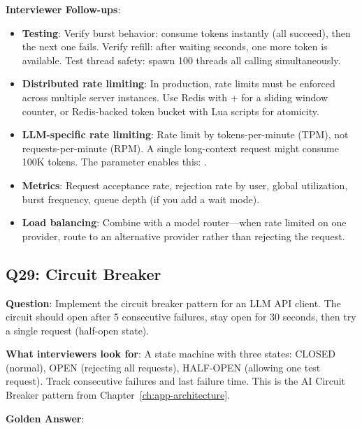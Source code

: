 \textbf{Interviewer Follow-ups}:
\begin{itemize}[leftmargin=*]
    \item \textbf{Testing}: Verify burst behavior: consume  tokens instantly (all succeed), then the next one fails. Verify refill: after waiting  seconds, one more token is available. Test thread safety: spawn 100 threads all calling  simultaneously.
    \item \textbf{Distributed rate limiting}: In production, rate limits must be enforced across multiple server instances. Use Redis with  +  for a sliding window counter, or Redis-backed token bucket with Lua scripts for atomicity.
    \item \textbf{LLM-specific rate limiting}: Rate limit by tokens-per-minute (TPM), not requests-per-minute (RPM). A single long-context request might consume 100K tokens. The  parameter enables this: .
    \item \textbf{Metrics}: Request acceptance rate, rejection rate by user, global utilization, burst frequency, queue depth (if you add a wait mode).
    \item \textbf{Load balancing}: Combine with a model router---when rate limited on one provider, route to an alternative provider rather than rejecting the request.
\end{itemize}

\subsection{Q29: Circuit Breaker}

\textbf{Question}: Implement the circuit breaker pattern for an LLM API client. The circuit should open after 5 consecutive failures, stay open for 30 seconds, then try a single request (half-open state).

\textbf{What interviewers look for}: A state machine with three states: CLOSED (normal), OPEN (rejecting all requests), HALF-OPEN (allowing one test request). Track consecutive failures and last failure time. This is the AI Circuit Breaker pattern from Chapter~\ref{ch:app-architecture}.

\textbf{Golden Answer}:

